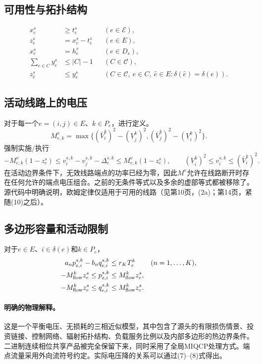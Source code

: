 \documentclass[11pt]{article}
\begin{document}
\subsection{可用性与拓扑结构}
\begin{align*}
x_e^s&\geq t_e^s &&(e\in\mathcal E),\\
z_e^s&=x_e^s-t_e^s &&(e\in E),\\
x_e^s&=h_e^s &&(e\in D_s),\\
\sum_{e\in C}y_e^s&\leq |C|-1 &&(C\in\mathcal C),\\
z_{\hat e}^s&\leq y_e^s
 &&(C\in\mathcal C,\ e\in C,\ \hat e\in E:\delta(\hat e)=\delta(e)).
\end{align*}

\subsection{活动线路上的电压}
对于每一个$e=(i,j)\in E$、$k\in P_e$，进行定义。
\[
 M_{e,k}^{v}=\max\{(\bar V_i^k)^2-(\underline V_j^k)^2,
                    (\bar V_j^k)^2-(\underline V_i^k)^2\}.
\]
强制实施/执行
\[
-M_{e,k}^{v}(1-z_e^s)
\le v_i^{s,k}-v_j^{s,k}-\Delta_e^{s,k}
\le M_{e,k}^{v}(1-z_e^s),
\qquad
(\underline V_i^k)^2\le v_i^{s,k}\le(\bar V_i^k)^2.
\]
在活动边界条件下，无效线路端点的功率已经为零，因此$M^v$允许在线路断开时存在任何允许的端点电压组合。之前的无条件等式以及多余的虚部等式都被移除了。源代码中明确说明，欧姆定律仅适用于可用的线路（见第10页，(2a)；第14页，紧随(10)之后）。

\subsection{多边形容量和活动限制}
对于$e\in E$、$i\in\delta(e)$和$k\in P_e$，
\begin{align*}
a_n p_{e,i}^{s,k}-b_n q_{e,i}^{s,k}
 &\leq r_K T_e^k &&(n=1,\ldots,K),\\
-M_{\rm flow}^k z_e^s\leq p_{e,i}^{s,k}
 &\leq M_{\rm flow}^k z_e^s,\\
-M_{\rm flow}^k z_e^s\leq q_{e,i}^{s,k}
 &\leq M_{\rm flow}^k z_e^s.
\end{align*}

\paragraph{明确的物理解释。}
这是一个平衡电压、无损耗的三相近似模型，其中包含了源头的有限损伤情景、投资链接、控制网络、辐射拓扑结构、负载服务比例以及内部多边形的热边界条件。二进制连续相位共享产品被完全保留下来，同时采用了全局MIQCP处理方式。端点流量采用外向流符号约定。实际电压降的关系可以通过(7)--(8)式得出。
\end{document}
